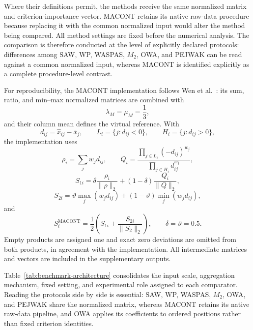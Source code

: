 \documentclass[reqno,11pt]{amsart}
\theoremstyle{definition}
\theoremstyle{plain}
\theoremstyle{remark}
\begin{document}
Where their definitions permit, the methods receive the same normalized
matrix and criterion-importance vector. MACONT retains its native
raw-data procedure because replacing it with the common normalized input
would alter the method being compared. All method settings are fixed
before the numerical analysis. The comparison is therefore conducted at
the level of explicitly declared protocols: differences among SAW, WP,
WASPAS, $M_2$, OWA, and PEJWAK can be read against a common normalized
input, whereas MACONT is identified explicitly as a complete
procedure-level contrast.

For reproducibility, the MACONT implementation follows Wen et al.~\cite{Wen2020}: its sum, ratio, and min--max normalized matrices are combined with
\[
\lambda_M=\mu_M=\frac13,
\]
and their column mean defines the virtual reference. With
\[
d_{ij}=\widehat{x}_{ij}-\bar{x}_j,
\qquad
L_i=\{j:d_{ij}<0\},
\qquad
H_i=\{j:d_{ij}>0\},
\]
the implementation uses
\[
\rho_i=\sum_jw_jd_{ij},
\qquad
Q_i=
\frac{\prod_{j\in L_i}(-d_{ij})^{w_j}}
{\prod_{j\in H_i}d_{ij}^{w_j}},
\]
\[
S_{1i}
=
\delta\frac{\rho_i}{\|\rho\|_2}
+(1-\delta)\frac{Q_i}{\|Q\|_2},
\]
\[
S_{2i}
=
\vartheta\max_j(w_jd_{ij})
+(1-\vartheta)\min_j(w_jd_{ij}),
\]
and
\begin{equation*}
S_i^{\mathrm{MACONT}}
=
\frac12\left(S_{1i}+\frac{S_{2i}}{\|S_2\|_2}\right),
\qquad
\delta=\vartheta=0.5.
\end{equation*}
Empty products are assigned one and exact zero deviations are omitted from both products, in agreement with the implementation. All intermediate matrices and vectors are included in the supplementary outputs.

Table~\ref{tab:benchmark-architecture} consolidates the input scale, aggregation mechanism, fixed setting, and experimental role assigned to each comparator. Reading the protocols side by side is essential: SAW, WP, WASPAS, $M_2$, OWA, and PEJWAK share the normalized matrix, whereas MACONT retains its native raw-data pipeline, and OWA applies its coefficients to ordered positions rather than fixed criterion identities.
\end{document}

